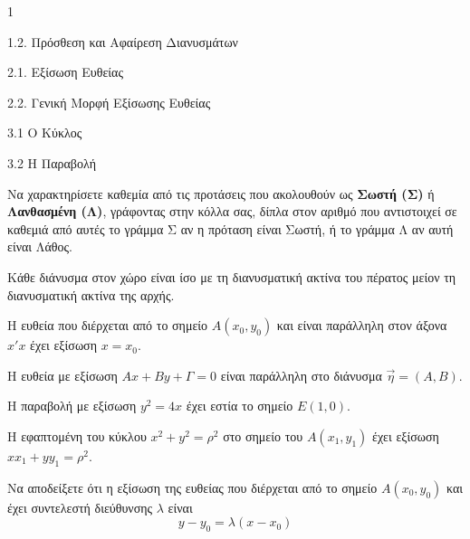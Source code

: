 \begin{ylh}{1}
    \item 1.2. Πρόσθεση και Αφαίρεση Διανυσμάτων
    \item 2.1. Εξίσωση Ευθείας
    \item 2.2. Γενική Μορφή Εξίσωσης Ευθείας
    \item 3.1 Ο Κύκλος
    \item 3.2 Η Παραβολή
\end{ylh}

\begin{alist}
    \item Να χαρακτηρίσετε καθεμία από τις προτάσεις που ακολουθούν ως \textbf{Σωστή (Σ)} ή \textbf{Λανθασμένη (Λ)}, γράφοντας στην κόλλα σας, δίπλα στον αριθμό που αντιστοιχεί σε καθεμιά από αυτές το γράμμα Σ αν η πρόταση είναι Σωστή, ή το γράμμα Λ αν αυτή είναι Λάθος.
    \begin{rlist}
        \item Κάθε διάνυσμα στον χώρο είναι ίσο με τη διανυσματική ακτίνα του πέρατος μείον τη διανυσματική ακτίνα της αρχής.
        \item Η ευθεία που διέρχεται από το σημείο $A(x_0,y_0)$ και είναι παράλληλη στον άξονα $x'x$ έχει εξίσωση $x = x_0$.
        \item Η ευθεία με εξίσωση $Ax + By + \Gamma = 0$ είναι παράλληλη στο διάνυσμα $\vec{\eta} = (A,B)$.
        \item Η παραβολή με εξίσωση $y^2 = 4x$ έχει εστία το σημείο $E(1,0)$.
        \item Η εφαπτομένη του κύκλου $x^2 + y^2 = \rho^2$ στο σημείο του $A(x_1,y_1)$ έχει εξίσωση $xx_1 + yy_1 = \rho^2$.
    \end{rlist} 
    \item Να αποδείξετε ότι η εξίσωση της ευθείας που διέρχεται από το σημείο $A(x_0,y_0)$ και έχει συντελεστή διεύθυνσης $\lambda$ είναι
    \[ y - y_0 = \lambda(x - x_0) \] 
\end{alist}